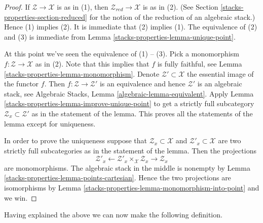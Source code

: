 \begin{proof}
If $\mathcal{Z} \to \mathcal{X}$ is as in (1), then
$\mathcal{Z}_{red} \to \mathcal{X}$ is as in (2). (See
Section \ref{stacks-properties-section-reduced}
for the notion of the reduction of an algebraic stack.)
Hence (1) implies (2).
It is immediate that (2) implies (1).
The equivalence of (2) and (3) is immediate from
Lemma \ref{stacks-properties-lemma-unique-point}.

\medskip\noindent
At this point we've seen the equivalence of (1) -- (3).
Pick a monomorphism $f : \mathcal{Z} \to \mathcal{X}$ as in (2).
Note that this implies that $f$ is fully faithful, see
Lemma \ref{stacks-properties-lemma-monomorphism}.
Denote $\mathcal{Z}' \subset \mathcal{X}$ the essential image of the functor
$f$. Then $f : \mathcal{Z} \to \mathcal{Z}'$ is an equivalence and hence
$\mathcal{Z}'$ is an algebraic stack, see
Algebraic Stacks, Lemma \ref{algebraic-lemma-equivalent}.
Apply
Lemma \ref{stacks-properties-lemma-improve-unique-point}
to get a strictly full subcategory $\mathcal{Z}_x \subset \mathcal{Z}'$
as in the statement of the lemma.
This proves all the statements of the lemma except for uniqueness.

\medskip\noindent
In order to prove the uniqueness suppose that
$\mathcal{Z}_x \subset \mathcal{X}$
and
$\mathcal{Z}'_x \subset \mathcal{X}$
are two strictly full subcategories as in the statement of the lemma.
Then the projections
$$
\mathcal{Z}'_x
\longleftarrow
\mathcal{Z}'_x \times_\mathcal{X} \mathcal{Z}_x
\longrightarrow
\mathcal{Z}_x
$$
are monomorphisms. The algebraic stack in the middle is nonempty by
Lemma \ref{stacks-properties-lemma-points-cartesian}.
Hence the two projections are isomorphisms by
Lemma \ref{stacks-properties-lemma-monomorphism-into-point}
and we win.
\end{proof}

Having explained the above we can now make the following definition.

